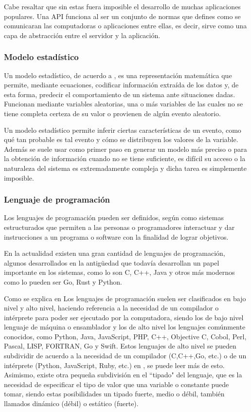 Cabe resaltar que sin estas fuera imposible el desarrollo de muchas aplicaciones
populares. Una API funciona al ser un conjunto de normas que defines como se
comunicaran las computadoras o aplicaciones entre ellas, es decir, sirve como
una capa de abstracción entre el servidor y la aplicación.

\subsubsection{Modelo estadístico}

Un modelo estadístico, de acuerdo a \cite{modeloIBM}, es una representación
matemática que permite, mediante
ecuaciones, codificar información extraída de los datos y, de esta forma,
predecir el comportamiento de un sistema ante situaciones dadas. Funcionan
mediante  variables aleatorias, una o más variables de las cuales no
se tiene completa certeza de su valor o provienen de algún evento aleatorio.

Un modelo estadístico permite inferir ciertas características de un evento,
como qué tan probable es tal evento y cómo se distribuyen los valores de la
variable. Además se suele usar como primer paso en generar un modelo más
preciso o para la obtención de información cuando no se tiene suficiente,
es difícil su acceso o la naturaleza del
sistema es extremadamente compleja y dicha tarea es simplemente imposible.


\subsubsection{Lenguaje de programación}
Los lenguajes de programación pueden ser definidos, según \cite{ETAC} como
sistemas estructurados
que permiten a las personas o programadores interactuar y dar instrucciones a un
programa o software con la finalidad de lograr objetivos.

En la actualidad existen una gran cantidad de lenguajes de programación, algunos
desarrollados en la antigüedad que todavía desarrollan un papel importante en
los sistemas, como lo son C, C++, Java y otros más modernos como lo pueden ser
Go, Rust y Python.

Como se explica en \cite{javaTpoint}
Los lenguajes de programación suelen ser clasificados en bajo nivel y alto nivel,
haciendo referencia a la necesidad de un compilador o intérprete para poder ser
ejecutado por la computadora, siendo los de bajo nivel lenguaje de máquina o
ensamblador y los de alto nivel los lenguajes comúnmente conocidos, como
Python, Java, JavaScript, PHP, C++, Objective C, Cobol, Perl, Pascal, LISP,
FORTRAN, Go y Swift. Estos lenguajes de alto nivel se pueden subdividir
de acuerdo a la necesidad de un compilador (C,C++,Go, etc.) o de un intérprete
(Python, JavaScript, Ruby, etc.) en \cite{LenguajesCompiladosEInterpretados}, se
puede leer más de esto. Asimismo, existe otra pequeña subdivisión en el ``tipado"
del lenguaje, que es la necesidad de especificar el tipo de valor que una
variable o constante puede tomar, siendo estas posibilidades un tipado fuerte,
medio o débil, también llamados dinámico (débil) o estático (fuerte).


